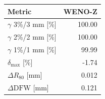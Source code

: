 \begin{tabular}{lr}
\toprule
Metric & WENO-Z \\
\midrule
$\gamma$ 3\%/3 mm [\%] & 100.00 \\
$\gamma$ 2\%/2 mm [\%] & 100.00 \\
$\gamma$ 1\%/1 mm [\%] & 99.99 \\
$\delta_{\max}$ [\%] & -1.74 \\
$\Delta R_{80}$ [mm] & 0.012 \\
$\Delta\mathrm{DFW}$ [mm] & 0.121 \\
\bottomrule
\end{tabular}
